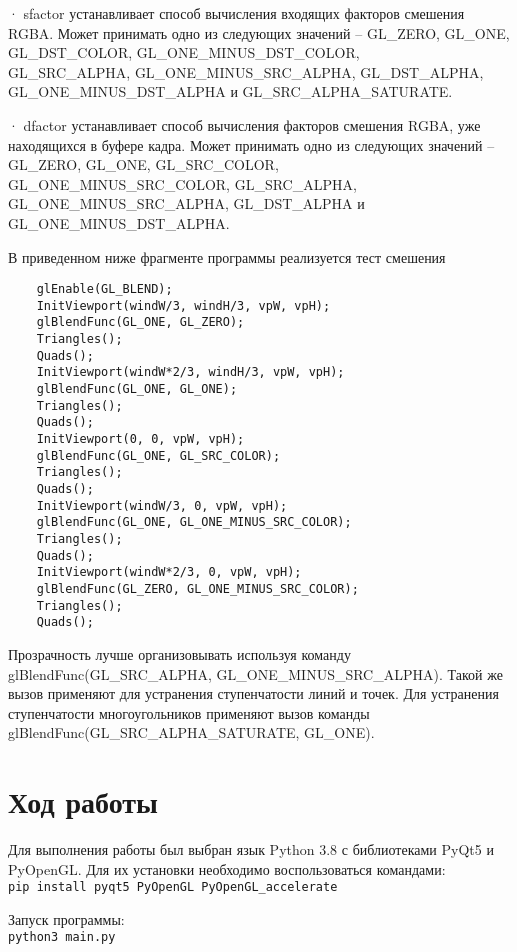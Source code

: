 · sfactor устанавливает способ вычисления входящих факторов смешения RGBA. Может принимать одно из следующих значений – GL\_ZERO, GL\_ONE, GL\_DST\_COLOR, GL\_ONE\_MINUS\_DST\_COLOR,\\ GL\_SRC\_ALPHA, GL\_ONE\_MINUS\_SRC\_ALPHA, GL\_DST\_ALPHA, GL\_ONE\_MINUS\_DST\_ALPHA и GL\_SRC\_ALPHA\_SATURATE.

· dfactor устанавливает способ вычисления факторов смешения RGBA, уже находящихся в буфере кадра.
Может принимать одно из следующих значений – GL\_ZERO, GL\_ONE, GL\_SRC\_COLOR,\\ GL\_ONE\_MINUS\_SRC\_COLOR, GL\_SRC\_ALPHA,\\ GL\_ONE\_MINUS\_SRC\_ALPHA, GL\_DST\_ALPHA и\\ GL\_ONE\_MINUS\_DST\_ALPHA.

В приведенном ниже фрагменте программы реализуется тест смешения

\small
\begin{verbatim}
    glEnable(GL_BLEND);
    InitViewport(windW/3, windH/3, vpW, vpH);
    glBlendFunc(GL_ONE, GL_ZERO);
    Triangles();
    Quads();
    InitViewport(windW*2/3, windH/3, vpW, vpH);
    glBlendFunc(GL_ONE, GL_ONE);
    Triangles();
    Quads();
    InitViewport(0, 0, vpW, vpH);
    glBlendFunc(GL_ONE, GL_SRC_COLOR);
    Triangles();
    Quads();
    InitViewport(windW/3, 0, vpW, vpH);
    glBlendFunc(GL_ONE, GL_ONE_MINUS_SRC_COLOR);
    Triangles();
    Quads();
    InitViewport(windW*2/3, 0, vpW, vpH);
    glBlendFunc(GL_ZERO, GL_ONE_MINUS_SRC_COLOR);
    Triangles();
    Quads();
\end{verbatim}
\normalsize

Прозрачность лучше организовывать используя команду \\glBlendFunc(GL\_SRC\_ALPHA, GL\_ONE\_MINUS\_SRC\_ALPHA).
Такой же вызов применяют для устранения ступенчатости линий и точек.
Для устранения ступенчатости многоугольников применяют вызов команды \\glBlendFunc(GL\_SRC\_ALPHA\_SATURATE, GL\_ONE).
\section*{Ход работы}
Для выполнения работы был выбран язык Python 3.8 с библиотеками PyQt5 и PyOpenGL.
Для их установки необходимо воспользоваться командами:\\
\texttt{pip install pyqt5 PyOpenGL PyOpenGL\_accelerate}

Запуск программы:\\
\texttt{python3 main.py}

